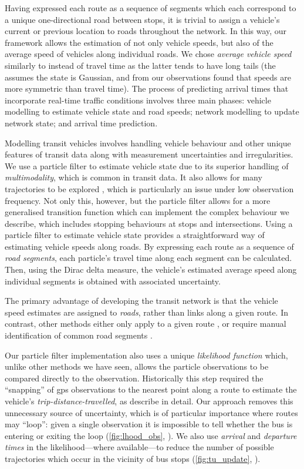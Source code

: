 Having expressed each route as a sequence of segments which each correspond to a unique one-directional road between stops, it is trivial to assign a vehicle's current or previous location to roads throughout the network. In this way, our framework allows the estimation of not only vehicle speeds, but also of the average speed of vehicles along individual roads. We chose \emph{average vehicle speed} similarly to \citet{Celan_2017, Celan_2018} instead of travel time \citep{Shalaby_2004, Dai_2019} as the latter tends to have long tails (the \kf{} assumes the state is Gaussian, and from our observations found that speeds are more symmetric than travel time). The process of predicting arrival times that incorporate real-time traffic conditions involves three main phases: vehicle modelling to estimate vehicle state and road speeds; network modelling to update network state; and arrival time prediction.


Modelling transit vehicles involves handling vehicle behaviour and other unique features of transit data along with measurement uncertainties and irregularities. We use a particle filter to estimate vehicle state due to its superior handling of \emph{multimodality}, which is common in transit data. It also allows for many trajectories to be explored \citep{Hans_2015}, which is particularly an issue under low observation frequency. Not only this, however, but the particle filter allows for a more generalised transition function which can implement the complex behaviour we describe, which includes stopping behaviours at stops and intersections. Using a particle filter to estimate vehicle state provides a straightforward way of estimating vehicle speeds along roads. By expressing each route as a sequence of \emph{road segments}, each particle's travel time along each segment can be calculated. Then, using the Dirac delta measure, the vehicle's estimated average speed along individual segments is obtained with associated uncertainty.


The primary advantage of developing the transit network is that the vehicle speed estimates are assigned to \emph{roads}, rather than links along a given route. In contrast, other methods either only apply to a given route \citep{Yu_2010,Celan_2017,Chang_2010}, or require manual identification of common road segments \citep{Yu_2011,Yin_2017}.


Our particle filter implementation also uses a unique \emph{likelihood function} which, unlike other methods we have seen, allows the particle observations to be compared directly to the observation. Historically this step required the ``snapping'' of \gls{gps} observations to the nearest point along a route to estimate the vehicle's \emph{trip-distance-travelled}, as \citet{Cathey_2003} describe in detail. Our approach removes this unnecessary source of uncertainty, which is of particular importance where routes may ``loop'': given a single observation it is impossible to tell whether the bus is entering or exiting the loop (\cref{fig:lhood_obs}, ). We also use \emph{arrival} and \emph{departure times} in the likelihood---where available---to reduce the number of possible trajectories which occur in the vicinity of bus stops (\cref{fig:tu_update}, ).


